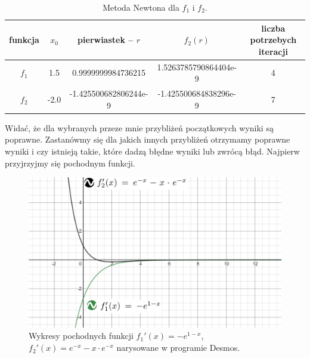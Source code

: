 \documentclass[]{article}
\begin{document}
	\begin{table}[!h]
	\centering
	\label{tab:table1}
		\begin{tabular}{|c|c|c|c|c|}
			\hline
			funkcja & $x_0$ & pierwiastek -- $r$ & $f_2(r)$ & liczba potrzebych iteracji\\
			\hline
			$f_1$ & 1.5 & 0.9999999984736215 & 1.5263785790864404e-9 & 4 \\ \hline
			$f_2$ &-2.0 & -1.425500682806244e-9 & -1.425500684838296e-9 & 7 \\ \hline
		\end{tabular}
		\caption*{Metoda Newtona dla $f_1$ i $f_2$.}
	\end{table}

	Widać, że dla wybranych przeze mnie przybliżeń początkowych wyniki są poprawne.
	Zastanówmy się dla jakich innych przybliżeń otrzymamy poprawne wyniki i czy istnieją takie, które dadzą błędne wyniki lub zwrócą błąd. Najpierw przyjrzyjmy się pochodnym funkcji.
	\begin{figure}[!htbp]
		\includegraphics[height=0.39\textheight]{task6derivatives}
		\centering
		\caption{Wykresy pochodnych funkcji $f_1'(x) = -e^{1-x}$, 
			$f_2'(x) = e^{-x} - x\cdot e^{-x}$ narysowane w programie Desmos.}
	\end{figure}
\end{document}
